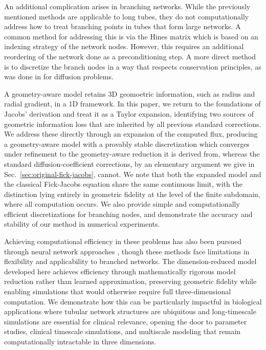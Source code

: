 \documentclass[11pt]{article}
\begin{document}
 An additional complication arises in branching networks. While the previously mentioned methods are applicable to long tubes, they do not computationally address how to treat branching points in tubes that form large networks. A common method for addressing this is via the Hines matrix \cite{Hines1984} which is based on an indexing strategy of the network nodes. However, this requires an additional reordering of the network done as a preconditioning step. A more direct method is to discretize the branch nodes in a way that respects conservation principles, as was done in \cite{BRNQ2023} for diffusion problems.
 
A geometry-aware model retains 3D geomoetric information, such as radius and radial gradient, in a 1D framework. In this paper, we return to the foundations of Jacobs' derivation \cite{Jacobs1935} and treat it as a Taylor expansion, identifying two sources of geometric information loss that are inherited by all previous standard corrections. We address these directly through an expansion of the computed flux, producing a geometry-aware model with a provably stable discretization which converges under refinement to the geometry-aware reduction it is derived from, whereas the standard diffusion-coefficient corrections, by an elementary argument we give in Sec.~\ref{sec:original-fick-jacobs}, cannot. We note that both the expanded model and the classical Fick-Jacobs equation share the same continuous limit, with the distinction lying entirely in geometric fidelity at the level of the finite subdomain, where all computation occurs. We also provide simple and computationally efficient discretizations for branching nodes, and demonstrate the accuracy and stability of our method in numerical experiments.


Achieving computational efficiency in these problems has also been pursued through neural network approaches \cite{GG2024, MQ2024, MFK2021}, though these methods face limitations in flexibility and applicability to branched networks. The dimension-reduced model developed here achieves efficiency through mathematically rigorous model reduction rather than learned approximation, preserving geometric fidelity while enabling simulations that would otherwise require full three-dimensional computation. We demonstrate how this can be particularly impactful in biological applications where tubular network structures are ubiquitous and long-timescale simulations are essential for clinical relevance, opening the door to parameter studies, clinical timescale simulations, and multiscale modeling that remain computationally intractable in three dimensions.
\end{document}
